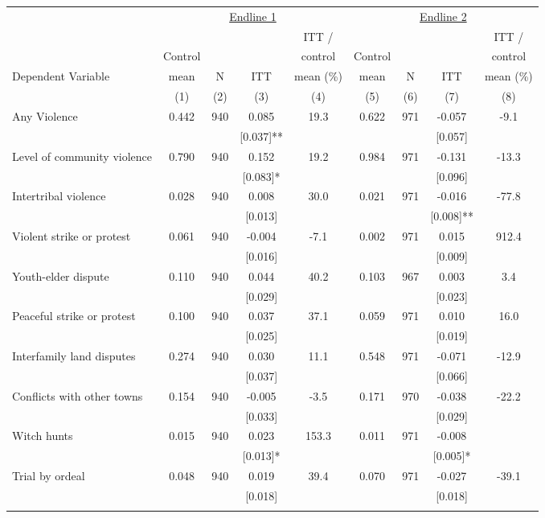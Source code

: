\begin{tabular}{lcccccccc}
\hline \noalign{\smallskip} & \multicolumn{4}{c}{\uline{\hfill Endline 1 \hfill}} & \multicolumn{4}{c}{\uline{\hfill Endline 2 \hfill}}\\
 &  &  &  & ITT /  &  &  &  & ITT /\\
 & Control &  &  & control & Control &  &  & control\\
Dependent Variable & mean & N & ITT & mean (\%) & mean & N & ITT & mean (\%)\\
 & (1) & (2) & (3) & (4) & (5) & (6) & (7) & (8)\\
\noalign{\smallskip}\hline \noalign{\smallskip}Any Violence & 0.442 & 940 & 0.085 & 19.3 & 0.622 & 971 & -0.057 & -9.1\\
 &  &  & [0.037]** &  &  &  & [0.057] & \\
Level of community violence & 0.790 & 940 & 0.152 & 19.2 & 0.984 & 971 & -0.131 & -13.3\\
 &  &  & [0.083]* &  &  &  & [0.096] & \\
\quad Intertribal violence & 0.028 & 940 & 0.008 & 30.0 & 0.021 & 971 & -0.016 & -77.8\\
 &  &  & [0.013] &  &  &  & [0.008]** & \\
\quad Violent strike or protest & 0.061 & 940 & -0.004 & -7.1 & 0.002 & 971 & 0.015 & 912.4\\
 &  &  & [0.016] &  &  &  & [0.009] & \\
\quad Youth-elder dispute & 0.110 & 940 & 0.044 & 40.2 & 0.103 & 967 & 0.003 & 3.4\\
 &  &  & [0.029] &  &  &  & [0.023] & \\
\quad Peaceful strike or protest & 0.100 & 940 & 0.037 & 37.1 & 0.059 & 971 & 0.010 & 16.0\\
 &  &  & [0.025] &  &  &  & [0.019] & \\
\quad Interfamily land disputes & 0.274 & 940 & 0.030 & 11.1 & 0.548 & 971 & -0.071 & -12.9\\
 &  &  & [0.037] &  &  &  & [0.066] & \\
\quad Conflicts with other towns & 0.154 & 940 & -0.005 & -3.5 & 0.171 & 970 & -0.038 & -22.2\\
 &  &  & [0.033] &  &  &  & [0.029] & \\
\quad Witch hunts & 0.015 & 940 & 0.023 & 153.3 & 0.011 & 971 & -0.008 & \\
 &  &  & [0.013]* &  &  &  & [0.005]* & \\
\quad Trial by ordeal & 0.048 & 940 & 0.019 & 39.4 & 0.070 & 971 & -0.027 & -39.1\\
 &  &  & [0.018] &  &  &  & [0.018] & \\
\noalign{\smallskip}\hline\end{tabular}
